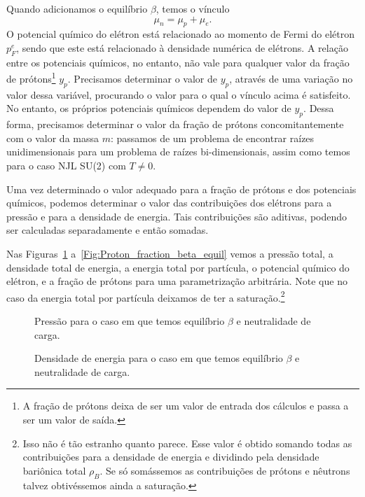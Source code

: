 Quando adicionamos o equilíbrio $\beta$, temos o vínculo
\begin{equation*}
	\mu_n = \mu_p + \mu_e.
\end{equation*}
%
O potencial químico do elétron está relacionado ao momento de Fermi do elétron $p_F^e$, sendo que este está relacionado à densidade numérica de elétrons. A relação entre os potenciais químicos, no entanto, não vale para qualquer valor da fração de prótons\footnote{A fração de prótons deixa de ser um valor de entrada dos cálculos e passa a ser um valor de saída.} $y_p$. Precisamos determinar o valor de $y_p$, através de uma variação no valor dessa variável, procurando o valor para o qual o vínculo acima é satisfeito. No entanto, os próprios potenciais químicos dependem do valor de $y_p$. Dessa forma, precisamos determinar o valor da fração de prótons concomitantemente com o valor da massa $m$: passamos de um problema de encontrar raízes unidimensionais para um problema de raízes bi-dimensionais, assim como temos para o caso NJL SU(2) com $T \neq 0$.

Uma vez determinado o valor adequado para a fração de prótons e dos potenciais químicos, podemos determinar o valor das contribuições dos elétrons para a pressão e para a densidade de energia. Tais contribuições são aditivas, podendo ser calculadas separadamente e então somadas.

Nas Figuras~\ref{Fig:Pressure_beta_equil} a~\ref{Fig:Proton_fraction_beta_equil} vemos a pressão total, a densidade total de energia, a energia total por partícula, o potencial químico do elétron, e a fração de prótons para uma parametrização arbitrária. Note que no caso da energia total por partícula deixamos de ter a saturação.\footnote{Isso não é tão estranho quanto parece. Esse valor é obtido somando todas as contribuições para a densidade de energia e dividindo pela densidade bariônica total $\rho_B$. Se só somássemos as contribuições de prótons e nêutrons talvez obtivéssemos ainda a saturação.}

\begin{figure}
	
	\caption{Pressão para o caso em que temos equilíbrio $\beta$ e neutralidade de carga. \protect}
	\label{Fig:Pressure_beta_equil}
\end{figure}

\begin{figure}
	
	\caption{Densidade de energia para o caso em que temos equilíbrio $\beta$ e neutralidade de carga. \protect}
	\label{Fig:energy_density_beta_equil}
\end{figure}

